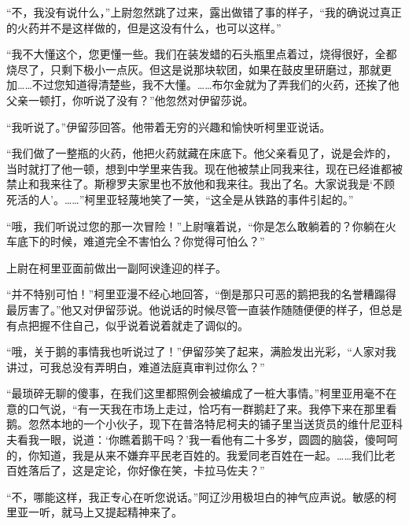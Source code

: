 \par “不，我没有说什么，”上尉忽然跳了过来，露出做错了事的样子，“我的确说过真正的火药并不是这样做的，但是这没有什么，也可以这样。”
\par “我不大懂这个，您更懂一些。我们在装发蜡的石头瓶里点着过，烧得很好，全都烧尽了，只剩下极小一点灰。但这是说那块软团，如果在鼓皮里研磨过，那就更加……不过您知道得清楚些，我不大懂。……布尔金就为了弄我们的火药，还挨了他父亲一顿打，你听说了没有？”他忽然对伊留莎说。
\par “我听说了。”伊留莎回答。他带着无穷的兴趣和愉快听柯里亚说话。
\par “我们做了一整瓶的火药，他把火药就藏在床底下。他父亲看见了，说是会炸的，当时就打了他一顿，想到中学里来告我。现在他被禁止同我来往，现在已经谁都被禁止和我来往了。斯穆罗夫家里也不放他和我来往。我出了名。大家说我是‘不顾死活的人’。……”柯里亚轻蔑地笑了一笑，“这全是从铁路的事件引起的。”
\par “哦，我们听说过您的那一次冒险！”上尉嚷着说，“你是怎么敢躺着的？你躺在火车底下的时候，难道完全不害怕么？你觉得可怕么？”
\par 上尉在柯里亚面前做出一副阿谀逢迎的样子。
\par “并不特别可怕！”柯里亚漫不经心地回答，“倒是那只可恶的鹅把我的名誉糟蹋得最厉害了。”他又对伊留莎说。他说话的时候尽管一直装作随随便便的样子，但总是有点把握不住自己，似乎说着说着就走了调似的。
\par “哦，关于鹅的事情我也听说过了！”伊留莎笑了起来，满脸发出光彩，“人家对我讲过，可我总没有弄明白，难道法庭真审判过你么？”
\par “最琐碎无聊的傻事，在我们这里都照例会被编成了一桩大事情。”柯里亚用毫不在意的口气说，“有一天我在市场上走过，恰巧有一群鹅赶了来。我停下来在那里看鹅。忽然本地的一个小伙子，现下在普洛特尼柯夫的铺子里当送货员的维什尼亚科夫看我一眼，说道：‘你瞧着鹅干吗？’我一看他有二十多岁，圆圆的脑袋，傻呵呵的，你知道，我是从来不嫌弃平民老百姓的。我爱同老百姓在一起。……我们比老百姓落后了，这是定论，你好像在笑，卡拉马佐夫？”
\par “不，哪能这样，我正专心在听您说话。”阿辽沙用极坦白的神气应声说。敏感的柯里亚一听，就马上又提起精神来了。
